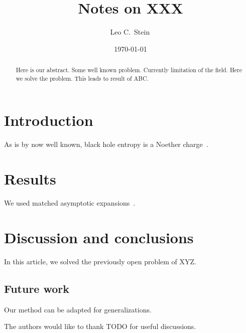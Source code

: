 \documentclass[aps,prd,twocolumn,superscriptaddress,preprintnumbers,floatfix,nofootinbib]{revtex4-2}
\begin{document}
\title{Notes on XXX}

\author{Leo C.\ Stein\,}


\date{\today}

\begin{abstract}
  Here is our abstract.
  Some well known problem.
  Currently limitation of the field.
  Here we solve the problem.
  This leads to result of ABC.
\end{abstract}

\maketitle


\section{Introduction}
\label{sec:introduction}

As is by now well known, black hole entropy is a Noether
charge~\cite{Wald:1993nt, Noether:1918zz}.

\section{Results}
\label{sec:results}

We used matched asymptotic expansions~\cite{bender1999advanced}.

\section{Discussion and conclusions}
\label{sec:disc-concl}

In this article, we solved the previously open problem of XYZ.

\subsection{Future work}
\label{sec:future-work}

Our method can be adapted for generalizations.

\acknowledgments
%
The authors would like to thank
%
TODO
%
for useful discussions.




\end{document}

